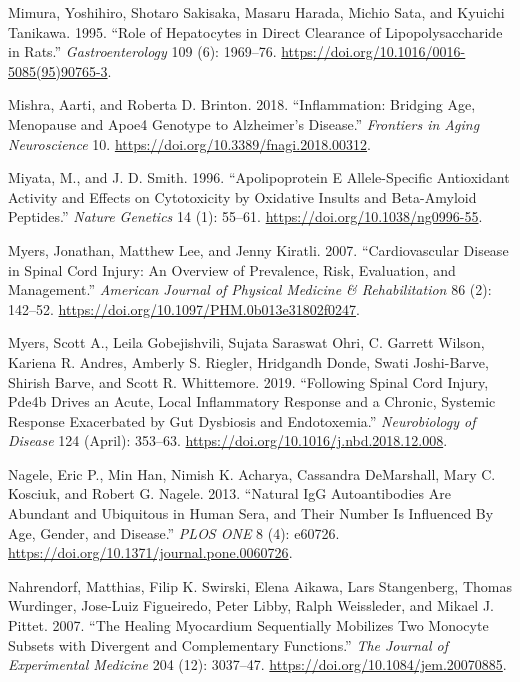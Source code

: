 \documentclass[9pt,lineno]{elife}
\newlength{\cslhangindent}
\newlength{\cslentryspacingunit} %
\newenvironment{CSLReferences}[2] %
 {%
  \setlength{\parindent}{0pt}
  \ifodd #1
  \let\oldpar\par
  \def\par{\hangindent=\cslhangindent\oldpar}
  \fi
  \setlength{\parskip}{#2\cslentryspacingunit}
 }%
 {}
\begin{document}
\begin{CSLReferences}{1}{0}
\leavevmode{}%
Mimura, Yoshihiro, Shotaro Sakisaka, Masaru Harada, Michio Sata, and Kyuichi Tanikawa. 1995. {``Role of Hepatocytes in Direct Clearance of Lipopolysaccharide in Rats.''} \emph{Gastroenterology} 109 (6): 1969--76. \url{https://doi.org/10.1016/0016-5085(95)90765-3}.

\leavevmode{}%
Mishra, Aarti, and Roberta D. Brinton. 2018. {``Inflammation: {Bridging Age}, {Menopause} and {Apoe4 Genotype} to {Alzheimer}'s {Disease}.''} \emph{Frontiers in Aging Neuroscience} 10. \url{https://doi.org/10.3389/fnagi.2018.00312}.

\leavevmode{}%
Miyata, M., and J. D. Smith. 1996. {``Apolipoprotein {E} Allele-Specific Antioxidant Activity and Effects on Cytotoxicity by Oxidative Insults and Beta-Amyloid Peptides.''} \emph{Nature Genetics} 14 (1): 55--61. \url{https://doi.org/10.1038/ng0996-55}.

\leavevmode{}%
Myers, Jonathan, Matthew Lee, and Jenny Kiratli. 2007. {``Cardiovascular {Disease} in {Spinal Cord Injury}: {An Overview} of {Prevalence}, {Risk}, {Evaluation}, and {Management}.''} \emph{American Journal of Physical Medicine \& Rehabilitation} 86 (2): 142--52. \url{https://doi.org/10.1097/PHM.0b013e31802f0247}.

\leavevmode{}%
Myers, Scott A., Leila Gobejishvili, Sujata Saraswat Ohri, C. Garrett Wilson, Kariena R. Andres, Amberly S. Riegler, Hridgandh Donde, Swati Joshi-Barve, Shirish Barve, and Scott R. Whittemore. 2019. {``Following Spinal Cord Injury, {Pde4b} Drives an Acute, Local Inflammatory Response and a Chronic, Systemic Response Exacerbated by Gut Dysbiosis and Endotoxemia.''} \emph{Neurobiology of Disease} 124 (April): 353--63. \url{https://doi.org/10.1016/j.nbd.2018.12.008}.

\leavevmode{}%
Nagele, Eric P., Min Han, Nimish K. Acharya, Cassandra DeMarshall, Mary C. Kosciuk, and Robert G. Nagele. 2013. {``Natural {IgG Autoantibodies Are Abundant} and {Ubiquitous} in {Human Sera}, and {Their Number Is Influenced By Age}, {Gender}, and {Disease}.''} \emph{PLOS ONE} 8 (4): e60726. \url{https://doi.org/10.1371/journal.pone.0060726}.

\leavevmode{}%
Nahrendorf, Matthias, Filip K. Swirski, Elena Aikawa, Lars Stangenberg, Thomas Wurdinger, Jose-Luiz Figueiredo, Peter Libby, Ralph Weissleder, and Mikael J. Pittet. 2007. {``The Healing Myocardium Sequentially Mobilizes Two Monocyte Subsets with Divergent and Complementary Functions.''} \emph{The Journal of Experimental Medicine} 204 (12): 3037--47. \url{https://doi.org/10.1084/jem.20070885}.


\end{CSLReferences}
\end{document}
